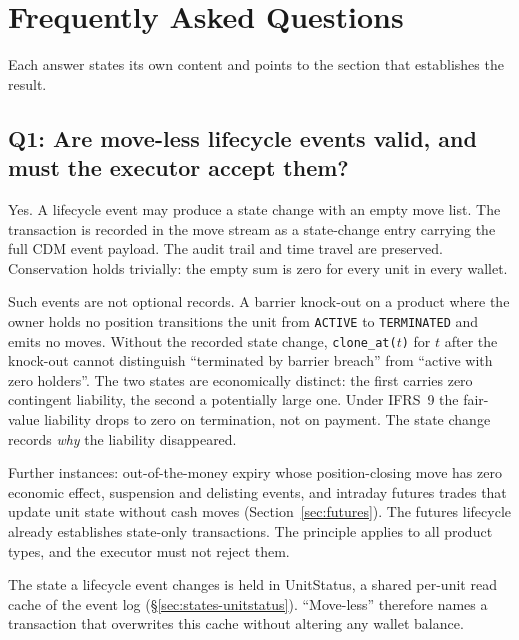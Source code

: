 \section{Frequently Asked Questions}
\label{sec:faq}

Each answer states its own content and points to the section that establishes the result.

\subsection*{Q1: Are move-less lifecycle events valid, and must the executor accept them?}

Yes. A lifecycle event may produce a state change with an empty move list. The transaction is recorded in the move stream as a state-change entry carrying the full CDM event payload. The audit trail and time travel are preserved. Conservation holds trivially: the empty sum is zero for every unit in every wallet.

Such events are not optional records. A barrier knock-out on a product where the owner holds no position transitions the unit from \texttt{ACTIVE} to \texttt{TERMINATED} and emits no moves. Without the recorded state change, \texttt{clone\_at($t$)} for $t$ after the knock-out cannot distinguish ``terminated by barrier breach'' from ``active with zero holders''. The two states are economically distinct: the first carries zero contingent liability, the second a potentially large one. Under IFRS~9 the fair-value liability drops to zero on termination, not on payment. The state change records \emph{why} the liability disappeared.

Further instances: out-of-the-money expiry whose position-closing move has zero economic effect, suspension and delisting events, and intraday futures trades that update unit state without cash moves (Section~\ref{sec:futures}). The futures lifecycle already establishes state-only transactions. The principle applies to all product types, and the executor must not reject them.

\begin{remark}
The state a lifecycle event changes is held in UnitStatus, a shared per-unit read cache of the event log (\S\ref{sec:states-unitstatus}). ``Move-less'' therefore names a transaction that overwrites this cache without altering any wallet balance.
\end{remark}

